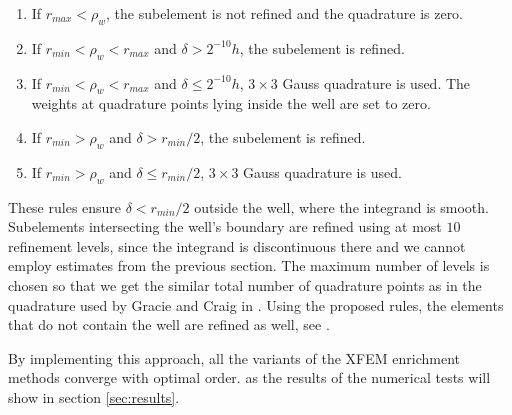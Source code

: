 
\begin{enumerate}
 \item If $r_{max} < \rho_w$, the subelement is not refined and the quadrature is zero.
 \item If $r_{min} < \rho_w < r_{max}$ and $\delta > 2^{-10}h$, the subelement is refined.
 \item If $r_{min} < \rho_w < r_{max}$ and $\delta \le 2^{-10}h$, $3\times3$ Gauss quadrature is used.
 The weights at quadrature points lying inside the well are set to zero.
 \item If $r_{min} > \rho_w$ and $\delta > r_{min} / 2$, the subelement is refined.
 \item If $r_{min} > \rho_w$ and $\delta \le r_{min} / 2$, $3\times3$ Gauss quadrature is used.
\end{enumerate}


These rules ensure $\delta < r_{min}/2$ outside the well, where the integrand is smooth. Subelements intersecting 
the well's boundary are refined using at most $10$ refinement levels, since the integrand is discontinuous there and we cannot employ 
estimates from the previous section. The maximum number of levels is chosen so that we get the similar total number of quadrature points 
as in the quadrature used by Gracie and Craig in \cite{gracie_modelling_2010}. Using the proposed rules, the elements that do not contain the well are refined as well,
see . 

By implementing this approach, all the variants of the XFEM enrichment methods converge with optimal order.
as the results of the numerical tests will show in section \ref{sec:results}.

